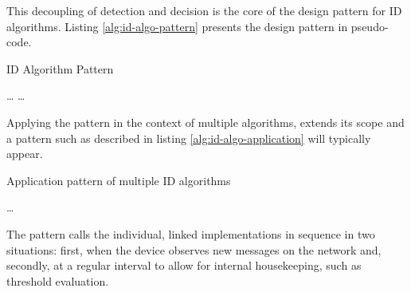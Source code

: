 \documentclass[3p,times,procedia]{elsarticle}
\begin{document}
This decoupling of detection and decision is the core of the design pattern for
ID algorithms. Listing \ref{alg:id-algo-pattern} presents the design pattern in
pseudo-code.

\begin{algorithm}[t]
  \caption{ID Algorithm Pattern}
  \label{alg:id-algo-pattern}
  \begin{algorithmic}
       \label{alg:id-algo-pattern-loop1}
       \State \dots {}
      \EndFor
        
      \State {}  \label{alg:id-algo-pattern-send1}
    \EndFunction
    \State
       \label{alg:id-algo-pattern-loop2} \label{alg:id-algo-pattern-common-data}
         
          \State \dots {}
          \State {}  \label{alg:id-algo-pattern-send2}
        \EndIf
      \EndFor
    \EndFunction
  \end{algorithmic}
\end{algorithm}

Applying the pattern in the context of multiple algorithms, extends its scope
and a pattern such as described in listing \ref{alg:id-algo-application} will
typically appear.

\begin{algorithm}[t]
  \caption{Application pattern of multiple ID algorithms}
  \label{alg:id-algo-application}
  \begin{algorithmic}
     
      \State {}
    \EndFor
    \State \dots
      \State {}
    \EndFor
  \end{algorithmic}
\end{algorithm}

The pattern calls the individual, linked implementations in sequence in two
situations: first, when the device observes new messages on the network and,
secondly, at a regular interval to allow for internal housekeeping, such as
threshold evaluation.
\end{document}

